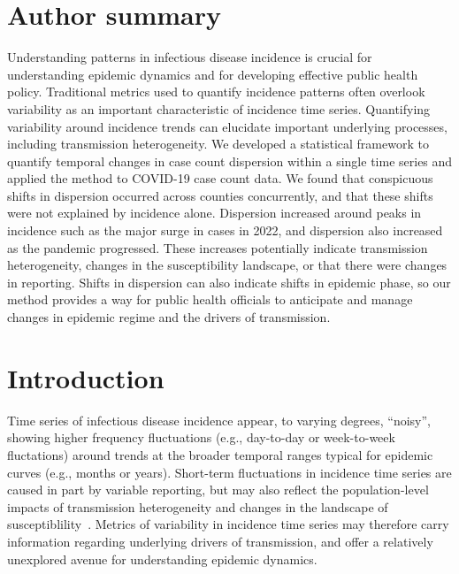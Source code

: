 \documentclass[11pt,letterpaper]{article}
\begin{document}
\section*{Author summary}
Understanding patterns in infectious disease incidence is crucial for understanding epidemic dynamics and for developing effective public health policy.
Traditional metrics used to quantify incidence patterns often overlook variability as an important characteristic of incidence time series. 
Quantifying variability around incidence trends can elucidate important underlying processes, including transmission heterogeneity.
We developed a statistical framework to quantify temporal changes in case count dispersion within a single time series and applied the method to COVID-19 case count data. 
We found that conspicuous shifts in dispersion occurred across counties concurrently, and that these shifts were not explained by incidence alone. 
Dispersion increased around peaks in incidence such as the major surge in cases in 2022, and dispersion also increased as the pandemic progressed. 
These increases potentially indicate transmission heterogeneity, changes in the susceptibility landscape, or that there were changes in reporting.
Shifts in dispersion can also indicate shifts in epidemic phase, so our method provides a way for public health officials to anticipate and manage changes in epidemic regime and the drivers of transmission. 

\clearpage
\section*{Introduction}
Time series of infectious disease incidence appear, to varying degrees, ``noisy'', showing higher frequency fluctuations (e.g., day-to-day or week-to-week fluctations) around trends at the broader temporal ranges typical for epidemic curves (e.g., months or years).
Short-term fluctuations in incidence time series are caused in part by variable reporting, but may also reflect the population-level impacts of transmission heterogeneity and changes in the landscape of susceptiblility~\citep{lloyd2005superspreading,lloyd2007maximum, lau2017spatial, dalziel2018urbanization, kirkegaard2021superspreading, sun2021transmission,guo2023statistical,ko2023time}.
Metrics of variability in incidence time series may therefore carry information regarding underlying drivers of transmission, and offer a relatively unexplored avenue for understanding epidemic dynamics. 
\end{document}

